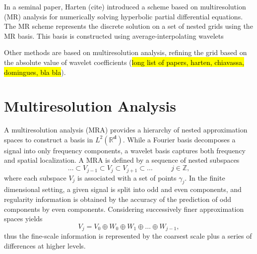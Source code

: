 \documentclass{article}
\begin{document}
    In a seminal paper, Harten (cite) introduced a scheme based on
    multiresolution (MR) analysis for numerically solving hyperbolic partial
    differential equations. The MR scheme represents the discrete solution on a
    set of nested grids using the MR basis. This basis is constructed using
    average-interpolating wavelets

    Other methods are based on multiresolution analysis, refining the grid based on
    the absolute value of wavelet coefficients (\hl{long list of papers, harten,
    chiavassa, domingues, bla bla}).

\section{Multiresolution Analysis}
A multiresolution analysis (MRA) provides a hierarchy of nested
approximation spaces to construct a basis in $L^2(\mathbb{R}^\mathbf{d})$.
While a Fourier basis decomposes a signal into only frequency components,
a wavelet basis captures both frequency and spatial localization. A MRA is
defined by a sequence of nested subspaces
\begin{equation*}
\dots \subset V_{j-1} \subset V_{j} \subset V_{j+1} \subset \dots \text{ }
\text{ } \text{ } \text{ } j\in \mathbb{Z},
\end{equation*}
where each subspace $V_{j}$ is associated with a set of points $\gamma_{j}$.
In the finite dimensional setting, a given signal is split
into odd and even components, and regularity information is obtained
by the accuracy of the prediction of odd components by even components.
Considering successively finer approximation spaces yields
\begin{equation*}
V_j = V_0 \oplus W_0 \oplus W_1 \oplus \dots \oplus W_{j-1},
\end{equation*}
thus the fine-scale information is represented by
the coarsest scale plus a series of differences at higher levels.
\end{document}
